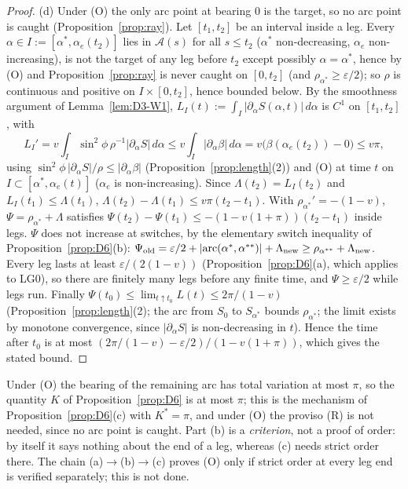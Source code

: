 \begin{proof}
(d) Under (O) the only arc point at bearing $0$ is the target, so no arc point is caught (Proposition~\ref{prop:ray}). Let
$[t_1,t_2]$ be an interval inside a leg. Every $\alpha\in I:=[\alpha^*,\alpha_e(t_2)]$ lies in $\mathcal A(s)$ for all $s\le t_2$
($\alpha^*$ non-decreasing, $\alpha_e$ non-increasing), is not the target of any leg before $t_2$ except possibly $\alpha=\alpha^*$,
hence by (O) and Proposition~\ref{prop:ray} is never caught on $[0,t_2]$ (and $\rho_{\alpha^*}\ge\varepsilon/2$); so $\rho$ is
continuous and positive on $I\times[0,t_2]$, hence bounded below. By the smoothness argument of Lemma~\ref{lem:D3-W1},
$L_I(t):=\int_I|\partial_\alpha S(\alpha,t)|\,d\alpha$ is $C^1$ on $[t_1,t_2]$, with
\[
L_I'=v\int_I\sin^2\!\phi\,\rho^{-1}|\partial_\alpha S|\,d\alpha\le v\int_I|\partial_\alpha\beta|\,d\alpha
=v\bigl(\beta(\alpha_e(t_2))-0\bigr)\le v\pi,
\]
using $\sin^2\!\phi\,|\partial_\alpha S|/\rho\le|\partial_\alpha\beta|$ (Proposition~\ref{prop:length}(2)) and (O) at time $t$ on
$I\subset[\alpha^*,\alpha_e(t)]$ ($\alpha_e$ is non-increasing). Since $\Lambda(t_2)=L_I(t_2)$ and $L_I(t_1)\le\Lambda(t_1)$,
$\Lambda(t_2)-\Lambda(t_1)\le v\pi(t_2-t_1)$. With $\rho_{\alpha^*}'=-(1-v)$, $\Psi=\rho_{\alpha^*}+\Lambda$ satisfies
$\Psi(t_2)-\Psi(t_1)\le-(1-v(1+\pi))(t_2-t_1)$ inside legs. $\Psi$ does not increase at switches, by the elementary switch
inequality of Proposition~\ref{prop:D6}(b):
$\Psi_{\rm old}=\varepsilon/2+|\mathrm{arc}(\alpha^*,\alpha^{**})|+\Lambda_{\rm new}\ge\rho_{\alpha^{**}}+\Lambda_{\rm new}$.
Every leg lasts at least $\varepsilon/(2(1-v))$ (Proposition~\ref{prop:D6}(a), which applies to LG0), so there are finitely many legs
before any finite time, and $\Psi\ge\varepsilon/2$ while legs run. Finally
$\Psi(t_0)\le\lim_{t\uparrow t_0}L(t)\le2\pi/(1-v)$ (Proposition~\ref{prop:length}(2); the arc from $S_0$ to $S_{\alpha^*}$ bounds
$\rho_{\alpha^*}$; the limit exists by monotone convergence, since $|\partial_\alpha S|$ is non-decreasing in $t$). Hence the time
after $t_0$ is at most $(2\pi/(1-v)-\varepsilon/2)/(1-v(1+\pi))$, which gives the stated bound.
\end{proof}

\begin{remark}
Under (O) the bearing of the remaining arc has total variation at most $\pi$, so the quantity $K$ of Proposition~\ref{prop:D6}
is at most $\pi$; this is the mechanism of Proposition~\ref{prop:D6}(c) with $K^*=\pi$, and under (O) the proviso (R) is not needed,
since no arc point is caught. Part (b) is a \emph{criterion}, not a
proof of order: by itself it says nothing about the end of a leg, whereas (c) needs strict order there. The chain
(a)$\to$(b)$\to$(c) proves (O) only if strict order at every leg end is verified separately; this is not done.
\end{remark}

